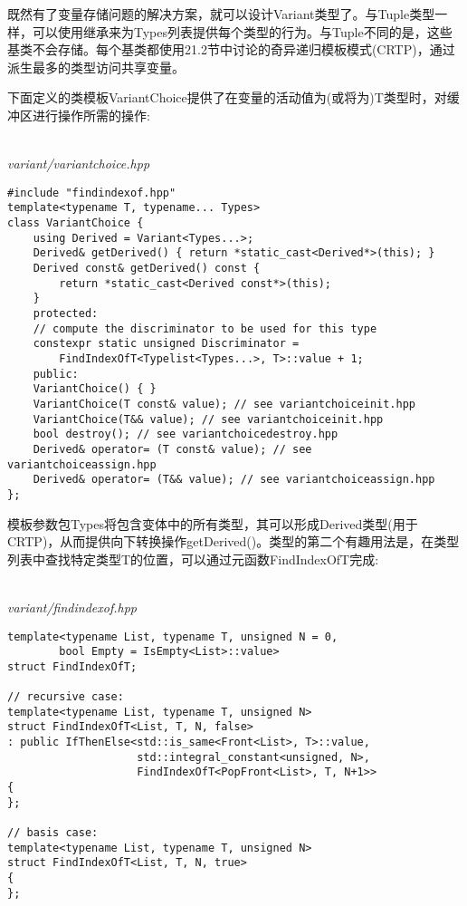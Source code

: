 
既然有了变量存储问题的解决方案，就可以设计Variant类型了。与Tuple类型一样，可以使用继承来为Types列表提供每个类型的行为。与Tuple不同的是，这些基类不会存储。每个基类都使用21.2节中讨论的奇异递归模板模式(CRTP)，通过派生最多的类型访问共享变量。

下面定义的类模板VariantChoice提供了在变量的活动值为(或将为)T类型时，对缓冲区进行操作所需的操作:

\hspace*{\fill} \\ %
\noindent
\textit{variant/variantchoice.hpp}
\begin{lstlisting}[style=styleCXX]
#include "findindexof.hpp"
template<typename T, typename... Types>
class VariantChoice {
	using Derived = Variant<Types...>;
	Derived& getDerived() { return *static_cast<Derived*>(this); }
	Derived const& getDerived() const {
		return *static_cast<Derived const*>(this);
	}
	protected:
	// compute the discriminator to be used for this type
	constexpr static unsigned Discriminator =
		FindIndexOfT<Typelist<Types...>, T>::value + 1;
	public:
	VariantChoice() { }
	VariantChoice(T const& value); // see variantchoiceinit.hpp
	VariantChoice(T&& value); // see variantchoiceinit.hpp
	bool destroy(); // see variantchoicedestroy.hpp
	Derived& operator= (T const& value); // see variantchoiceassign.hpp
	Derived& operator= (T&& value); // see variantchoiceassign.hpp
};
\end{lstlisting}

模板参数包Types将包含变体中的所有类型，其可以形成Derived类型(用于CRTP)，从而提供向下转换操作getDerived()。类型的第二个有趣用法是，在类型列表中查找特定类型T的位置，可以通过元函数FindIndexOfT完成:

\hspace*{\fill} \\ %
\noindent
\textit{variant/findindexof.hpp}
\begin{lstlisting}[style=styleCXX]
template<typename List, typename T, unsigned N = 0,
		bool Empty = IsEmpty<List>::value>
struct FindIndexOfT;

// recursive case:
template<typename List, typename T, unsigned N>
struct FindIndexOfT<List, T, N, false>
: public IfThenElse<std::is_same<Front<List>, T>::value,
					std::integral_constant<unsigned, N>,
					FindIndexOfT<PopFront<List>, T, N+1>>
{
};

// basis case:
template<typename List, typename T, unsigned N>
struct FindIndexOfT<List, T, N, true>
{
};
\end{lstlisting}

